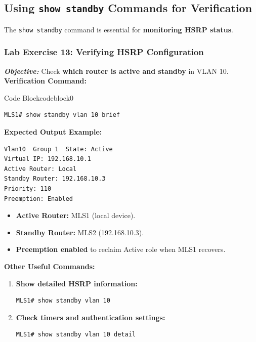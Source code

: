\documentclass[a4paper]{book}
\begin{document}
\subsection{Using \texttt{show standby} Commands for Verification}
The \texttt{show standby} command is essential for \textbf{monitoring HSRP status}.

\subsubsection{Lab Exercise 13: Verifying HSRP Configuration}
\textbf{\textit{Objective:}} Check \textbf{which router is active and standby} in VLAN 10.
\vspace{1.5em}
\textbf{Verification Command:}


\vspace{1.5em}


\begin{ocg}{Code Block}{codeblock}{0}

\vspace{0.5cm}
\begin{lstlisting}
MLS1# show standby vlan 10 brief
\end{lstlisting}
\end{ocg}


\textbf{Expected Output Example:}
\begin{lstlisting}
Vlan10  Group 1  State: Active
Virtual IP: 192.168.10.1
Active Router: Local
Standby Router: 192.168.10.3
Priority: 110
Preemption: Enabled
\end{lstlisting}

\begin{itemize}
\item \textbf{Active Router:} MLS1 (local device).
\item \textbf{Standby Router:} MLS2 (192.168.10.3).
\item \textbf{Preemption enabled} to reclaim Active role when MLS1 recovers.
\end{itemize}

\textbf{Other Useful Commands:}
\begin{enumerate}
\item \textbf{Show detailed HSRP information:}
\begin{lstlisting}
MLS1# show standby vlan 10
\end{lstlisting}

\item \textbf{Check timers and authentication settings:}
\begin{lstlisting}
MLS1# show standby vlan 10 detail
\end{lstlisting}
\end{enumerate}
\end{document}
